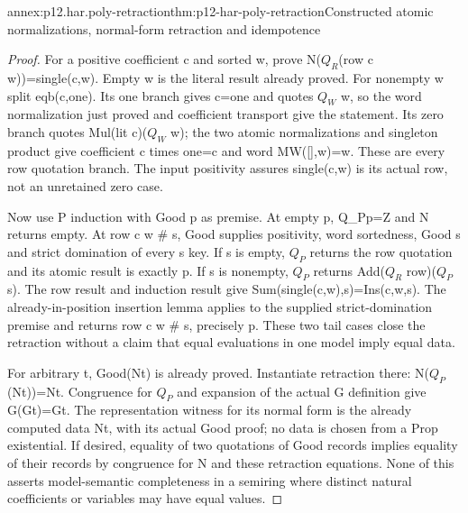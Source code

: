 \begin{annexitem}{annex:p12.har.poly-retraction}{thm:p12-har-poly-retraction}{Constructed atomic normalizations, normal-form retraction and idempotence}
\begin{proof}
For a positive coefficient c and sorted w, prove
N(\(Q_R\)(row c w))=single(c,w). Empty w is the literal result already
proved. For nonempty w split eqb(c,one). Its one branch gives c=one
and quotes \(Q_W\) w, so the word normalization just proved and coefficient
transport give the statement. Its zero branch quotes Mul(lit c)(\(Q_W\) w);
the two atomic normalizations and singleton product give coefficient
c times one=c and word MW([],w)=w. These are every row quotation
branch. The input positivity assures single(c,w) is its actual row,
not an unretained zero case.

Now use P induction with Good p as premise. At empty p, Q_Pp=Z
and N returns empty. At row c w \# s, Good supplies positivity,
word sortedness, Good s and strict domination of every s key.
If s is empty, \(Q_P\) returns the row quotation and its atomic result
is exactly p. If s is nonempty, \(Q_P\) returns Add(\(Q_R\) row)(\(Q_P\) s).
The row result and induction result give
Sum(single(c,w),s)=Ins(c,w,s). The already-in-position insertion
lemma applies to the supplied strict-domination premise and returns
row c w \# s, precisely p. These two tail cases close the retraction
without a claim that equal evaluations in one model imply equal data.

For arbitrary t, Good(Nt) is already proved. Instantiate retraction
there: N(\(Q_P\)(Nt))=Nt. Congruence for \(Q_P\) and expansion of the actual
G definition give G(Gt)=Gt. The representation witness for its normal
form is the already computed data Nt, with its actual Good proof;
no data is chosen from a Prop existential. If desired, equality of
two quotations of Good records implies equality of their records
by congruence for N and these retraction equations. None of this
asserts model-semantic completeness in a semiring where distinct
natural coefficients or variables may have equal values.
\end{proof}
\end{annexitem}

